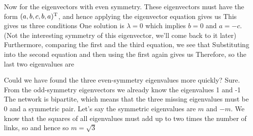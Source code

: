 Now for the eigenvectors with even symmetry. These eigenvectors must have the form $(a,b,c,b,a)^{\rm T}$, and hence applying the eigenvector equation gives us 
This gives us three conditions 
One solution is $\lambda=0$ which implies $b=0$ and $a=-c$. (Not the interesting symmetry of this eigenvector, we'll come back to it later)
Furthermore, comparing the first and the third equation, we see that  
Substituting into the second equation and then using the first again gives us 
Therefore,
so the last two eigenvalues are 

Could we have found the three even-symmetry eigenvalues more quickly? Sure. 
From the odd-symmetry eigenvectors we already know the eigenvalues 1 and -1
The network is bipartite, which means that the three missing eigenvalues must be 0 and a symmetric pair. Let's say the symmetric eigenvalues are $m$ and $-m$. We know that the squares of all eigenvalues must add up to two times the number of links, so 
and hence 
so $m=\sqrt{3}$

